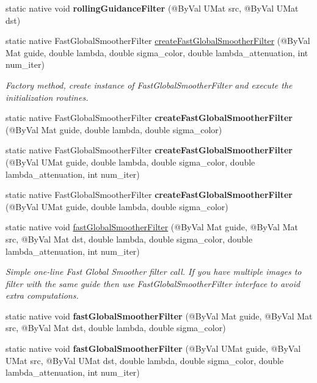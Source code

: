 \begin{DoxyCompactItemize}
\item 
static native void {\bfseries rolling\+Guidance\+Filter} (@By\+Val U\+Mat src, @By\+Val U\+Mat dst)
\item 
static native Fast\+Global\+Smoother\+Filter \hyperlink{group__ximgproc__filters_ga2464410b399f5f54dfce61987cfaa67e}{create\+Fast\+Global\+Smoother\+Filter} (@By\+Val Mat guide, double lambda, double sigma\+\_\+color, double lambda\+\_\+attenuation, int num\+\_\+iter)
\begin{DoxyCompactList}\small\item\em Factory method, create instance of Fast\+Global\+Smoother\+Filter and execute the initialization routines. \end{DoxyCompactList}\item 
static native Fast\+Global\+Smoother\+Filter {\bfseries create\+Fast\+Global\+Smoother\+Filter} (@By\+Val Mat guide, double lambda, double sigma\+\_\+color)
\item 
static native Fast\+Global\+Smoother\+Filter {\bfseries create\+Fast\+Global\+Smoother\+Filter} (@By\+Val U\+Mat guide, double lambda, double sigma\+\_\+color, double lambda\+\_\+attenuation, int num\+\_\+iter)
\item 
static native Fast\+Global\+Smoother\+Filter {\bfseries create\+Fast\+Global\+Smoother\+Filter} (@By\+Val U\+Mat guide, double lambda, double sigma\+\_\+color)
\item 
static native void \hyperlink{group__ximgproc__filters_gad387c802487ca58e07a45c896a13688f}{fast\+Global\+Smoother\+Filter} (@By\+Val Mat guide, @By\+Val Mat src, @By\+Val Mat dst, double lambda, double sigma\+\_\+color, double lambda\+\_\+attenuation, int num\+\_\+iter)
\begin{DoxyCompactList}\small\item\em Simple one-\/line Fast Global Smoother filter call. If you have multiple images to filter with the same guide then use Fast\+Global\+Smoother\+Filter interface to avoid extra computations. \end{DoxyCompactList}\item 
static native void {\bfseries fast\+Global\+Smoother\+Filter} (@By\+Val Mat guide, @By\+Val Mat src, @By\+Val Mat dst, double lambda, double sigma\+\_\+color)
\item 
static native void {\bfseries fast\+Global\+Smoother\+Filter} (@By\+Val U\+Mat guide, @By\+Val U\+Mat src, @By\+Val U\+Mat dst, double lambda, double sigma\+\_\+color, double lambda\+\_\+attenuation, int num\+\_\+iter)
\item 

\end{DoxyCompactItemize}
